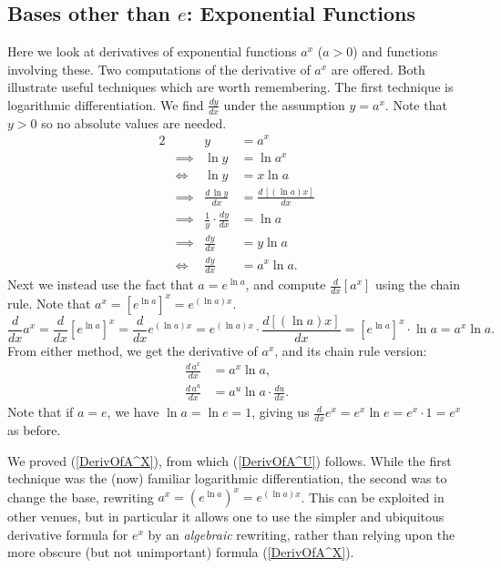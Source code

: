 \eex

\subsection{Bases other than $e$: Exponential Functions}
Here we look at derivatives of exponential functions $a^x$ ($a>0$) and
functions involving these.  
Two computations of the derivative of $a^x$ are offered.
Both illustrate useful techniques which are worth remembering.
The first technique is logarithmic differentiation.  We find $\frac{dy}{dx}$
under the assumption $y=a^x$. Note that $y>0$ so no absolute values are
needed.
\begin{alignat*}{2}
&&y&=a^x\\
&\implies& \ln y&=\ln a^x\\
&\iff &\ln y&=x\ln a\\
&\implies& \frac{d\,\ln y}{dx}&=\frac{d\,[(\ln a)x]}{dx}\\
&\implies&\frac1y\cdot\frac{dy}{dx}&=\ln a\\
&\implies&\frac{dy}{dx}&=y\ln a\\
&\iff &\frac{dy}{dx}&=a^x\ln a.\end{alignat*}
Next we instead use the fact that $a=e^{\ln a}$, and compute
$\frac{d}{dx}\left[a^x\right]$ using the chain rule.  Note that
$a^x=\left[e^{\ln a}\right]^x=e^{(\ln a)x}$.
$$\frac{d}{dx}a^x=\frac{d}{dx}\left[e^{\ln a}\right]^x
               =\frac{d}{dx}e^{(\ln a)x}
               =e^{(\ln a)x}\cdot\frac{d[(\ln a)x]}{dx}
               =\left[e^{\ln a}\right]^x\cdot\ln a
               =a^x\ln a.$$
From either method, we get the derivative of $a^x$, and
its chain rule version:
\begin{align}
\frac{d\,a^x}{dx}&=a^x\ln a,\label{DerivOfA^X}\\
\frac{d\,a^u}{dx}&=a^u\ln a\cdot\frac{du}{dx}.\label{DerivOfA^U}
\end{align}
Note that if $a=e$, we have $\ln a=\ln e=1$, giving us 
$\frac{d}{dx}e^x=e^x\ln e=e^x\cdot1=e^x$ as before.


We proved (\ref{DerivOfA^X}), from which (\ref{DerivOfA^U}) follows.
While the first technique was the (now) familiar logarithmic differentiation,
the second was to change the base, rewriting
$a^x=(e^{\ln a})^x=e^{(\ln a)x}$.  This can be exploited in other
venues, but in particular it allows one to use the simpler and
ubiquitous derivative formula for $e^x$ by an {\it algebraic}
rewriting, rather than relying upon the more obscure (but not
unimportant) formula (\ref{DerivOfA^X}).
       
